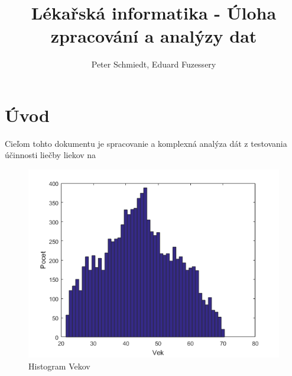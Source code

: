 \documentclass[11pt]{article}
\author{Peter Schmiedt, Eduard Fuzessery}
\title{Lékařská informatika - Úloha zpracování a analýzy dat}
\begin{document}
\begin{titlepage}
	\maketitle
\end{titlepage}



\section{Úvod}
Cieľom tohto dokumentu je spracovanie a komplexná analýza dát z testovania účinnosti liečby liekov na 


\begin{figure}[h!]
	\centering
  		\includegraphics[width=1.0\textwidth]{ages.png}
  	\caption{Histogram Vekov}
\end{figure}
\end{document}
